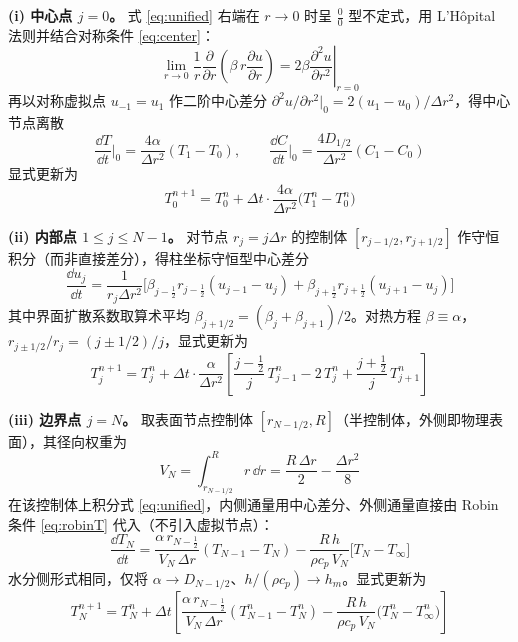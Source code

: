 \textbf{(i) 中心点 $j=0$。} 式 \eqref{eq:unified} 右端在 $r\to0$ 时呈 $\tfrac00$ 型不定式，用 L'H\^opital 法则并结合对称条件 \eqref{eq:center}：
\begin{equation}
  \lim_{r\to0}\frac{1}{r}\frac{\partial}{\partial r}\!\left(\beta\,r\frac{\partial u}{\partial r}\right)
  =2\beta\left.\frac{\partial^2 u}{\partial r^2}\right|_{r=0}
  \label{eq:lhopital}
\end{equation}
再以对称虚拟点 $u_{-1}=u_1$ 作二阶中心差分 $\partial^2u/\partial r^2|_0=2(u_1-u_0)/\Delta r^2$，得中心节点离散
\begin{equation}
  \frac{\dd T}{\dd t}\Big|_0=\frac{4\alpha}{\Delta r^2}(T_1-T_0),\qquad
  \frac{\dd C}{\dd t}\Big|_0=\frac{4D_{1/2}}{\Delta r^2}(C_1-C_0)
  \label{eq:center_disc}
\end{equation}
显式更新为
\begin{equation}
  T_0^{n+1}=T_0^{n}+\Delta t\cdot\frac{4\alpha}{\Delta r^2}\big(T_1^n-T_0^n\big)
  \label{eq:center_explicit}
\end{equation}

\textbf{(ii) 内部点 $1\le j\le N-1$。} 对节点 $r_j=j\Delta r$ 的控制体 $[r_{j-1/2},r_{j+1/2}]$ 作守恒积分（而非直接差分），得柱坐标守恒型中心差分
\begin{equation}
  \frac{\dd u_j}{\dd t}=\frac{1}{r_j\Delta r^2}\Big[\beta_{j-\frac12}r_{j-\frac12}(u_{j-1}-u_j)+\beta_{j+\frac12}r_{j+\frac12}(u_{j+1}-u_j)\Big]
  \label{eq:interior_disc}
\end{equation}
其中界面扩散系数取算术平均 $\beta_{j+1/2}=(\beta_j+\beta_{j+1})/2$。对热方程 $\beta\equiv\alpha$，$r_{j\pm1/2}/r_j=(j\pm1/2)/j$，显式更新为
\begin{equation}
  T_j^{n+1}=T_j^{n}+\Delta t\cdot\frac{\alpha}{\Delta r^2}
  \left[\frac{j-\tfrac12}{j}\,T_{j-1}^n-2\,T_j^n+\frac{j+\tfrac12}{j}\,T_{j+1}^n\right]
  \label{eq:interior_explicit}
\end{equation}

\textbf{(iii) 边界点 $j=N$。} 取表面节点控制体 $[r_{N-1/2},R]$（半控制体，外侧即物理表面），其径向权重为
\begin{equation}
  V_N=\int_{r_{N-1/2}}^{R}r\,\dd r=\frac{R\,\Delta r}{2}-\frac{\Delta r^2}{8}
  \label{eq:VN}
\end{equation}
在该控制体上积分式 \eqref{eq:unified}，内侧通量用中心差分、外侧通量直接由 Robin 条件 \eqref{eq:robinT} 代入（不引入虚拟节点）：
\begin{equation}
  \frac{\dd T_N}{\dd t}=
  \frac{\alpha\,r_{N-\frac12}}{V_N\,\Delta r}(T_{N-1}-T_N)
  -\frac{R\,h}{\rho c_p\,V_N}\big[T_N-T_\infty\big]
  \label{eq:boundary_disc}
\end{equation}
水分侧形式相同，仅将 $\alpha\to D_{N-1/2}$、$h/(\rho c_p)\to h_m$。显式更新为
\begin{equation}
  T_N^{n+1}=T_N^{n}+\Delta t\left[
  \frac{\alpha\,r_{N-\frac12}}{V_N\,\Delta r}(T_{N-1}^n-T_N^n)
  -\frac{R\,h}{\rho c_p\,V_N}\big(T_N^n-T_\infty^n\big)\right]
  \label{eq:boundary_explicit}
\end{equation}

